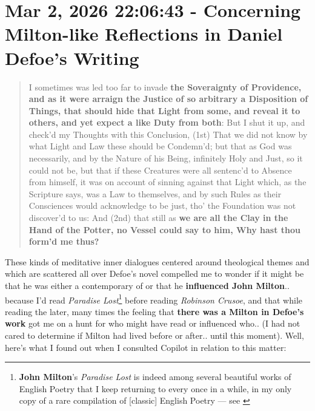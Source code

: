 \documentclass[a4paper]{article}
\begin{document}
\section{Mar 2, 2026 22:06:43 - Concerning Milton-like Reflections in Daniel Defoe's Writing}
\label{SEC54}


\noindent
\begin{minipage}{1\textwidth}
\vspace{1em}
\begin{quotation}
{\ttfamily


I sometimes was led too far to invade \textbf{the Soveraignty of Providence, and as it were arraign the Justice of so arbitrary a Disposition of Things, that should hide that Light from some, and reveal it to others, and yet expect a like Duty from both}: But I shut it up, and check’d my Thoughts with this Conclusion, (1st) That we did not know by what Light and Law these should be Condemn’d; but that as God was necessarily, and by the Nature of his Being, infinitely Holy and Just, so it could not be, but that if these Creatures were all sentenc’d to Absence from himself, it was on account of sinning against that Light which, as the Scripture says, was a Law to themselves, and by such Rules as their Consciences would acknowledge to be just, tho’ the Foundation was not discover’d to us: And (2nd) that still as \textbf{we are all the Clay in the Hand of the Potter, no Vessel could say to him, Why hast thou form’d me thus?}


}
\end{quotation}
\vspace{1em}
\end{minipage}



These kinds of meditative inner dialogues centered around theological themes and which are scattered all over Defoe's novel compelled me to wonder if it might be that he was either a contemporary of or that he \textbf{influenced John Milton}.. because I'd read \textit{Paradise Lost}\footnote{\textbf{John Milton}'s \textit{Paradise Lost} is indeed among several beautiful works of English Poetry that I keep returning to every once in a while, in my only copy of a rare compilation of [classic] English Poetry --- see \cite{wain1996oxford}} before reading \textit{Robinson Crusoe}, and that while reading the later, many times the feeling that \textbf{there was a Milton in Defoe's work} got me on a hunt for who might have read or influenced who.. (I had not cared to determine if Milton had lived before or after.. until this moment). Well, here's what I found out when I consulted Copilot in relation to this matter:
\end{document}
